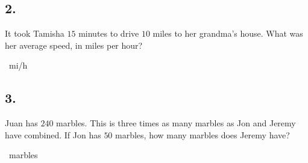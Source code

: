 \documentclass[12pt]{article}
\begin{document}
\subsection*{2.}
It took Tamisha $15$ minutes to drive $10$ miles to her grandma's house. What was her average speed, in miles per hour?

\nopagebreak

\fbox{\phantom{ANSWER}}~mi/h

\begin{answer}
%
\end{answer}


\subsection*{3.}
Juan has $240$ marbles. This is three times as many marbles as Jon and Jeremy have combined. If Jon has $50$ marbles, how many marbles does Jeremy have?

\nopagebreak

\fbox{\phantom{ANSWER}}~marbles
\end{document}
